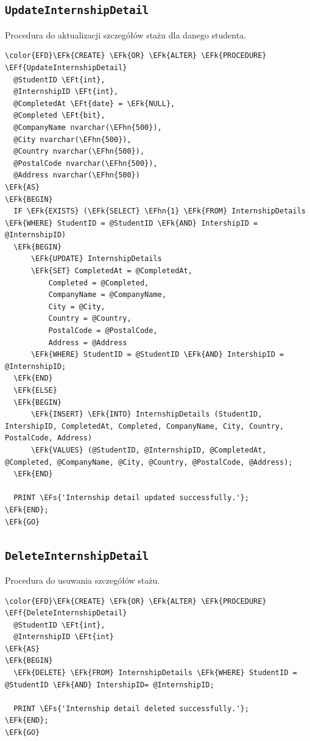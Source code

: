 \documentclass[11pt]{article}
\newcommand{\EFs}[1]{\textcolor{EFs}{#1}} %
\newcommand{\EFk}[1]{\textcolor{EFk}{\textbf{#1}}} %
\newcommand{\EFf}[1]{\textcolor{EFf}{#1}} %
\newcommand{\EFt}[1]{\textcolor{EFt}{\textbf{#1}}} %
\newcommand{\EFhn}[1]{\textcolor{EFhn}{#1}} %
\begin{document}
\subsection{\texttt{UpdateInternshipDetail}}
\label{sec:org8c8134b}
Procedura do aktualizacji szczegółów stażu dla danego studenta.
\begin{Code}
\begin{Verbatim}
\color{EFD}\EFk{CREATE} \EFk{OR} \EFk{ALTER} \EFk{PROCEDURE} \EFf{UpdateInternshipDetail}
  @StudentID \EFt{int},
  @InternshipID \EFt{int},
  @CompletedAt \EFt{date} = \EFk{NULL},
  @Completed \EFt{bit},
  @CompanyName nvarchar(\EFhn{500}),
  @City nvarchar(\EFhn{500}),
  @Country nvarchar(\EFhn{500}),
  @PostalCode nvarchar(\EFhn{500}),
  @Address nvarchar(\EFhn{500})
\EFk{AS}
\EFk{BEGIN}
  IF \EFk{EXISTS} (\EFk{SELECT} \EFhn{1} \EFk{FROM} InternshipDetails \EFk{WHERE} StudentID = @StudentID \EFk{AND} IntershipID = @InternshipID)
  \EFk{BEGIN}
      \EFk{UPDATE} InternshipDetails
      \EFk{SET} CompletedAt = @CompletedAt,
          Completed = @Completed,
          CompanyName = @CompanyName,
          City = @City,
          Country = @Country,
          PostalCode = @PostalCode,
          Address = @Address
      \EFk{WHERE} StudentID = @StudentID \EFk{AND} IntershipID = @InternshipID;
  \EFk{END}
  \EFk{ELSE}
  \EFk{BEGIN}
      \EFk{INSERT} \EFk{INTO} InternshipDetails (StudentID, IntershipID, CompletedAt, Completed, CompanyName, City, Country, PostalCode, Address)
      \EFk{VALUES} (@StudentID, @InternshipID, @CompletedAt, @Completed, @CompanyName, @City, @Country, @PostalCode, @Address);
  \EFk{END}

  PRINT \EFs{'Internship detail updated successfully.'};
\EFk{END};
\EFk{GO}
\end{Verbatim}
\end{Code}
\subsection{\texttt{DeleteInternshipDetail}}
\label{sec:orgc925361}
Procedura do usuwania szczegółów stażu.
\begin{Code}
\begin{Verbatim}
\color{EFD}\EFk{CREATE} \EFk{OR} \EFk{ALTER} \EFk{PROCEDURE} \EFf{DeleteInternshipDetail}
  @StudentID \EFt{int},
  @InternshipID \EFt{int}
\EFk{AS}
\EFk{BEGIN}
  \EFk{DELETE} \EFk{FROM} InternshipDetails \EFk{WHERE} StudentID = @StudentID \EFk{AND} IntershipID= @InternshipID;

  PRINT \EFs{'Internship detail deleted successfully.'};
\EFk{END};
\EFk{GO}
\end{Verbatim}
\end{Code}
\end{document}
